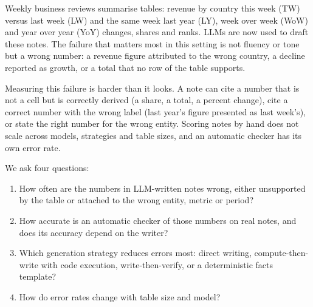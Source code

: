 \documentclass[11pt]{article}
\begin{document}
Weekly business reviews summarise tables: revenue by country this week (TW) versus last week (LW) and the same week last year (LY), week over week (WoW) and year over year (YoY) changes, shares and ranks. LLMs are now used to draft these notes. The failure that matters most in this setting is not fluency or tone but a wrong number: a revenue figure attributed to the wrong country, a decline reported as growth, or a total that no row of the table supports.

Measuring this failure is harder than it looks. A note can cite a number that is not a cell but is correctly derived (a share, a total, a percent change), cite a correct number with the wrong label (last year's figure presented as last week's), or state the right number for the wrong entity. Scoring notes by hand does not scale across models, strategies and table sizes, and an automatic checker has its own error rate.

We ask four questions:
\begin{enumerate}[label=\textbf{RQ\arabic*}]
  \item How often are the numbers in LLM-written notes wrong, either unsupported by the table or attached to the wrong entity, metric or period?
  \item How accurate is an automatic checker of those numbers on real notes, and does its accuracy depend on the writer?
  \item Which generation strategy reduces errors most: direct writing, compute-then-write with code execution, write-then-verify, or a deterministic facts template?
  \item How do error rates change with table size and model?
\end{enumerate}
\end{document}
